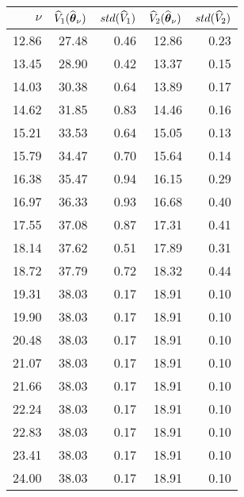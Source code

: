 \begin{tabular}{rrrrr}\hline 
$\nu$  & $\widehat{V}_1(\widehat{\boldsymbol{\theta}}_{\nu})$ & $std(\widehat{V}_1)$ & $\widehat{V}_2(\widehat{\boldsymbol{\theta}}_{\nu})$ & $std(\widehat{V}_2)$ \\ \hline 
   12.86 &    27.48 &     0.46  &    12.86 &      0.23  \\ 
   13.45 &    28.90 &     0.42  &    13.37 &      0.15  \\ 
   14.03 &    30.38 &     0.64  &    13.89 &      0.17  \\ 
   14.62 &    31.85 &     0.83  &    14.46 &      0.16  \\ 
   15.21 &    33.53 &     0.64  &    15.05 &      0.13  \\ 
   15.79 &    34.47 &     0.70  &    15.64 &      0.14  \\ 
   16.38 &    35.47 &     0.94  &    16.15 &      0.29  \\ 
   16.97 &    36.33 &     0.93  &    16.68 &      0.40  \\ 
   17.55 &    37.08 &     0.87  &    17.31 &      0.41  \\ 
   18.14 &    37.62 &     0.51  &    17.89 &      0.31  \\ 
   18.72 &    37.79 &     0.72  &    18.32 &      0.44  \\ 
   19.31 &    38.03 &     0.17  &    18.91 &      0.10  \\ 
   19.90 &    38.03 &     0.17  &    18.91 &      0.10  \\ 
   20.48 &    38.03 &     0.17  &    18.91 &      0.10  \\ 
   21.07 &    38.03 &     0.17  &    18.91 &      0.10  \\ 
   21.66 &    38.03 &     0.17  &    18.91 &      0.10  \\ 
   22.24 &    38.03 &     0.17  &    18.91 &      0.10  \\ 
   22.83 &    38.03 &     0.17  &    18.91 &      0.10  \\ 
   23.41 &    38.03 &     0.17  &    18.91 &      0.10  \\ 
   24.00 &    38.03 &     0.17  &    18.91 &      0.10  \\ \hline 
\end{tabular}